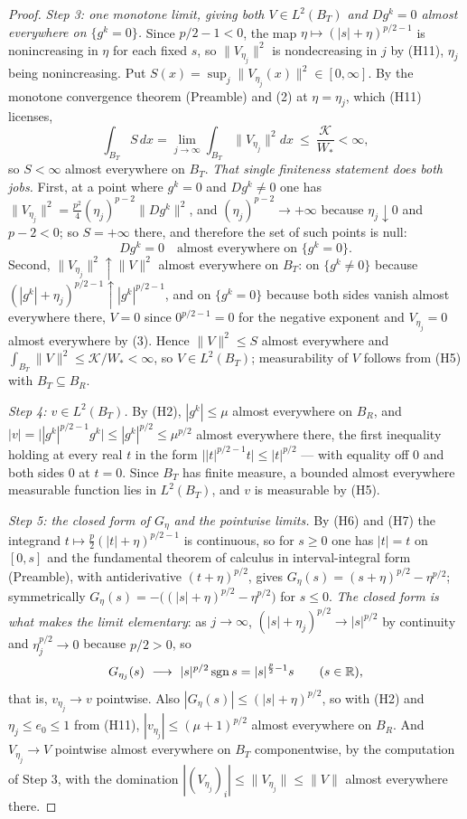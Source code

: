 \begin{proof}
\emph{Step 3: one monotone limit, giving both $V\in L^2(B_T)$ and
$Dg^k=0$ almost everywhere on $\{g^k=0\}$.}  Since $p/2-1<0$, the map
$\eta\mapsto(|s|+\eta)^{p/2-1}$ is nonincreasing in $\eta$ for each fixed $s$,
so $\|V_{\eta_j}\|^2$ is nondecreasing in $j$ by (H11), $\eta_j$ being
nonincreasing.  Put $S(x)=\sup_j\|V_{\eta_j}(x)\|^2\in[0,\infty]$.  By the
monotone convergence theorem (Preamble) and (2) at $\eta=\eta_j$, which (H11)
licenses,
\[
\int_{B_T}S\,dx=\lim_{j\to\infty}\int_{B_T}\|V_{\eta_j}\|^2dx
\ \le\ \frac{\mathcal K}{W_\ast}<\infty ,
\]
so $S<\infty$ almost everywhere on $B_T$.  \emph{That single finiteness
statement does both jobs.}  First, at a point where $g^k=0$ and $Dg^k\ne0$ one
has $\|V_{\eta_j}\|^2=\frac{p^2}4(\eta_j)^{p-2}\|Dg^k\|^2$, and
$(\eta_j)^{p-2}\to+\infty$ because $\eta_j\downarrow0$ and $p-2<0$; so
$S=+\infty$ there, and therefore the set of such points is null:
\[
Dg^k=0\quad\text{almost everywhere on }\{g^k=0\}.
\tag{3}
\]
Second, $\|V_{\eta_j}\|^2\uparrow\|V\|^2$ almost everywhere on $B_T$: on
$\{g^k\ne0\}$ because $(|g^k|+\eta_j)^{p/2-1}\uparrow|g^k|^{p/2-1}$, and on
$\{g^k=0\}$ because both sides vanish almost everywhere there, $V=0$ since
$0^{p/2-1}=0$ for the negative exponent and $V_{\eta_j}=0$ almost everywhere by
(3).  Hence $\|V\|^2\le S$ almost everywhere and
$\int_{B_T}\|V\|^2\le\mathcal K/W_\ast<\infty$, so $V\in L^2(B_T)$;
measurability of $V$ follows from (H5) with $B_T\subseteq B_R$.

\emph{Step 4: $v\in L^2(B_T)$.}  By (H2), $|g^k|\le\mu$ almost everywhere on
$B_R$, and $|v|=\bigl||g^k|^{p/2-1}g^k\bigr|\le|g^k|^{p/2}\le\mu^{p/2}$ almost
everywhere there, the first inequality holding at every real $t$ in the form
$\bigl||t|^{p/2-1}t\bigr|\le|t|^{p/2}$ --- with equality off $0$ and both sides
$0$ at $t=0$.  Since $B_T$ has finite measure, a bounded almost everywhere
measurable function lies in $L^2(B_T)$, and $v$ is measurable by (H5).

\emph{Step 5: the closed form of $G_\eta$ and the pointwise limits.}  By (H6)
and (H7) the integrand $t\mapsto\frac p2(|t|+\eta)^{p/2-1}$ is continuous, so
for $s\ge0$ one has $|t|=t$ on $[0,s]$ and the fundamental theorem of calculus
in interval-integral form (Preamble), with antiderivative $(t+\eta)^{p/2}$,
gives $G_\eta(s)=(s+\eta)^{p/2}-\eta^{p/2}$; symmetrically
$G_\eta(s)=-\bigl((|s|+\eta)^{p/2}-\eta^{p/2}\bigr)$ for $s\le0$.  \emph{The
closed form is what makes the limit elementary}: as $j\to\infty$,
$(|s|+\eta_j)^{p/2}\to|s|^{p/2}$ by continuity and $\eta_j^{p/2}\to0$ because
$p/2>0$, so
\[
G_{\eta_j}(s)\ \longrightarrow\ |s|^{p/2}\operatorname{sgn}s=|s|^{\frac p2-1}s
\qquad(s\in\R),
\]
that is, $v_{\eta_j}\to v$ pointwise.  Also
$|G_\eta(s)|\le(|s|+\eta)^{p/2}$, so with (H2) and $\eta_j\le e_0\le1$ from
(H11), $|v_{\eta_j}|\le(\mu+1)^{p/2}$ almost everywhere on $B_R$.  And
$V_{\eta_j}\to V$ pointwise almost everywhere on $B_T$ componentwise, by the
computation of Step 3, with the domination
$|(V_{\eta_j})_i|\le\|V_{\eta_j}\|\le\|V\|$ almost everywhere there.


\end{proof}
